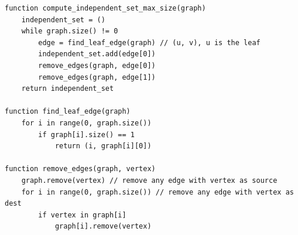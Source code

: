 \documentclass[11pt, oneside]{article}
\begin{document}
\begin{lstlisting}
function compute_independent_set_max_size(graph)
    independent_set = ()
    while graph.size() != 0
        edge = find_leaf_edge(graph) // (u, v), u is the leaf
        independent_set.add(edge[0])
        remove_edges(graph, edge[0]) 
        remove_edges(graph, edge[1])
    return independent_set

function find_leaf_edge(graph) 
    for i in range(0, graph.size())
        if graph[i].size() == 1
            return (i, graph[i][0])

function remove_edges(graph, vertex) 
    graph.remove(vertex) // remove any edge with vertex as source
    for i in range(0, graph.size()) // remove any edge with vertex as dest
        if vertex in graph[i]
            graph[i].remove(vertex)

\end{lstlisting}
\clearpage
\end{document}
